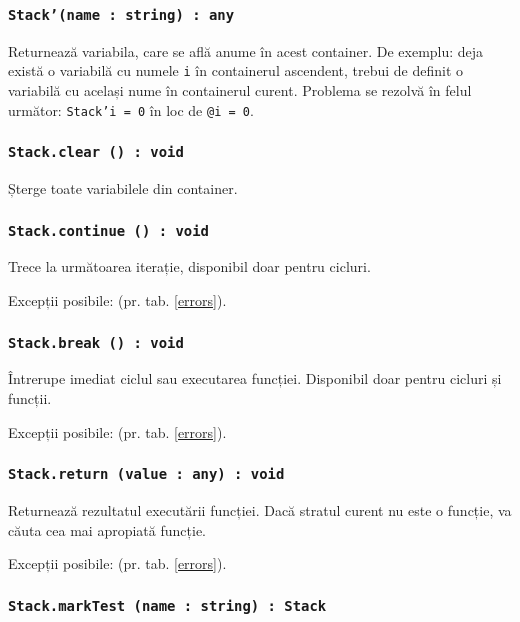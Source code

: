 \subsubsection{\texttt{Stack'(name : string) : any}}

Returnează variabila, care se află anume în acest container. De exemplu: deja există o variabilă cu numele \texttt{i} în containerul ascendent, trebui de definit o variabilă cu același nume în containerul curent. Problema se rezolvă în felul următor: \texttt{Stack'i = 0} în loc de \texttt{@i = 0}.

\subsubsection{\texttt{Stack.clear () : void}}

Șterge toate variabilele din container.

\subsubsection{\texttt{Stack.continue () : void}}

Trece la următoarea iterație, disponibil doar pentru cicluri.

Excepții posibile:  (pr. tab. \ref{errors}).

\subsubsection{\texttt{Stack.break () : void}}

Întrerupe imediat ciclul sau executarea funcției. Disponibil doar pentru cicluri și funcții.

Excepții posibile:  (pr. tab. \ref{errors}).

\subsubsection{\texttt{Stack.return (value : any) : void}}

Returnează rezultatul executării funcției. Dacă stratul curent nu este o funcție, va căuta cea mai apropiată funcție.

Excepții posibile:  (pr. tab. \ref{errors}).

\subsubsection{\texttt{Stack.markTest (name : string) : Stack}}

